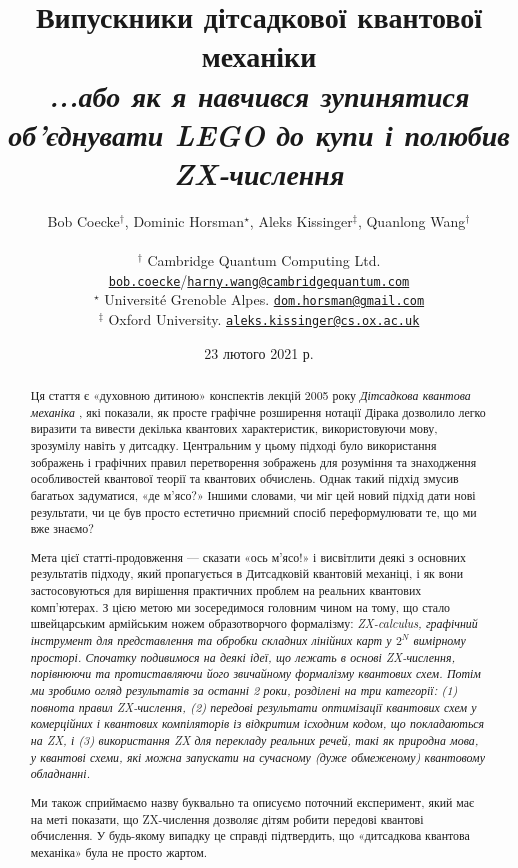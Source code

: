 \documentclass[11pt]{article}
\title{Випускники дітсадкової квантової механіки\vspace{2mm}
\\ \large\it ...або як я навчився зупинятися об'єднувати LEGO до купи і полюбив ZX-числення}
\author{Bob Coecke${}^\dagger$, Dominic Horsman${}^\star$, Aleks Kissinger${}^\ddagger$, Quanlong Wang${}^\dagger$\\
\ \\ 
${}^\dagger$ Cambridge Quantum Computing Ltd. \\ \href{mailto:bob.coecke@cambridgequantum.com}{\tt bob.coecke}/\href{mailto:harny.wang@cambridgequantum.com}{\tt harny.wang@cambridgequantum.com} \\
${}^\star$ Universit\'e Grenoble Alpes. \href{mailto:dom.horsman@gmail.com}{\tt dom.horsman@gmail.com}\\
${}^\ddagger$ Oxford University. \href{mailto:aleks.kissinger@cs.ox.ac.uk}{\tt aleks.kissinger@cs.ox.ac.uk}
}
\date{{23 лютого 2021 р.}}
\theoremstyle{definition}
\def\bR{\begin{color}{red}}
\def\e{\end{color}\xspace}
\newcommand{\TODOb}[1]{\marginpar{\scriptsize\bR \textbf{TODO:} #1\e}}
\begin{document}
  
\maketitle 

\begin{abstract} 
Ця стаття є «духовною дитиною» конспектів лекцій 2005 року \textit{Дітсадкова квантова механіка} \cite{Kindergarten}, які показали, як просте графічне розширення нотації Дірака дозволило легко виразити та вивести декілька квантових характеристик, використовуючи мову, зрозумілу навіть у дитсадку. Центральним у цьому підході було використання зображень і графічних правил перетворення зображень для розуміння та знаходження особливостей квантової теорії та квантових обчислень. Однак такий підхід змусив багатьох задуматися, «де м'ясо?» Іншими словами, чи міг цей новий підхід дати нові результати, чи це був просто естетично приємний спосіб переформулювати те, що ми вже знаємо?

Мета цієї статті-продовження — сказати «ось м'ясо!» і висвітлити деякі з основних результатів підходу, який пропагується в Дитсадковій квантовій механіці, і як вони застосовуються для вирішення практичних проблем на реальних квантових комп’ютерах. З цією метою ми зосередимося головним чином на тому, що стало швейцарським армійським ножем образотворчого формалізму: \em ZX-calculus\em, графічний інструмент для представлення та обробки складних лінійних карт у $2^N$ вимірному просторі. Спочатку подивимося
на деякі ідеї, що лежать в основі ZX-числення, порівнюючи та протиставляючи його звичайному формалізму квантових схем.
Потім ми зробимо огляд результатів за останні 2 роки, розділені на три категорії:
(1) повнота правил ZX-числення, (2) передові результати оптимізації квантових схем у комерційних і квантових компіляторів із відкритим ісходним кодом, що покладаються на ZX, і (3) використання ZX для перекладу реальних речей, такі як природна мова, у квантові схеми, які можна запускати на сучасному (дуже обмеженому) квантовому обладнанні.

Ми також сприймаємо назву буквально та описуємо поточний експеримент, який має на меті показати, що ZX-числення дозволяє дітям робити передові квантові обчислення. У будь-якому випадку це справді підтвердить, що «дитсадкова квантова механіка» була не просто жартом.
\end{abstract}
\end{document}

